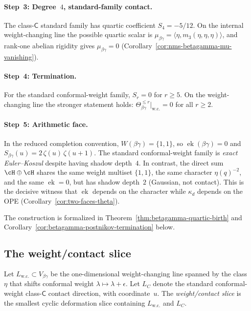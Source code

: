 \paragraph{Step~3: Degree~$4$, standard-family contact.}
The class-$\mathsf C$ standard family has quartic coefficient
$S_4=-5/12$. On the internal weight-changing line the possible
quartic scalar is
$\mu_{\beta\gamma}=\langle\eta,m_3(\eta,\eta,\eta)\rangle$, and
rank-one abelian rigidity gives
$\mu_{\beta\gamma}=0$
(Corollary~\ref{cor:nms-betagamma-mu-vanishing}).

\paragraph{Step~4: Termination.}
For the standard conformal-weight family, $S_r=0$ for $r\ge5$.
On the weight-changing line the stronger statement holds:
$\Theta_{\beta\gamma}^{\le r}|_{\mathrm{w.c.}}=0$ for all $r\ge2$.

\paragraph{Step~5: Arithmetic face.}
In the reduced completion convention,
$W(\beta\gamma) = \{1,1\}$, so
$\operatorname{ek}(\beta\gamma) = 0$ and
$S_{\beta\gamma}(u) = 2\,\zeta(u)\,\zeta(u{+}1)$.
The standard conformal-weight family is \emph{exact Euler--Koszul}
despite having shadow depth~$4$. In contrast, the direct
sum $\cH \oplus \cH$ shares the same weight multiset
$\{1,1\}$, the same character $\eta(q)^{-2}$, and the same
$\operatorname{ek} = 0$, but has shadow depth~$2$
(Gaussian, not contact). This is the decisive witness that
$\operatorname{ek}$ depends on the character while
$\kappa_d$ depends on the OPE
(Corollary~\ref{cor:two-faces-theta}).

\medskip
The construction is formalized in
Theorem~\ref{thm:betagamma-quartic-birth} and
Corollary~\ref{cor:betagamma-postnikov-termination} below.

\subsection{The weight/contact slice}

\begin{definition}
\label{def:betagamma-weight-contact-slice}
Let $L_{\mathrm{w.c.}}\subset V_{\beta\gamma}$ be the
one-dimensional weight-changing line spanned by the class $\eta$ that
shifts conformal weight $\lambda\mapsto\lambda+\epsilon$. Let
$L_C$ denote the standard conformal-weight class-$\mathsf C$
contact direction, with coordinate~$u$. The
\emph{weight/contact slice} is the smallest cyclic deformation slice
containing $L_{\mathrm{w.c.}}$ and $L_C$.
\end{definition}

